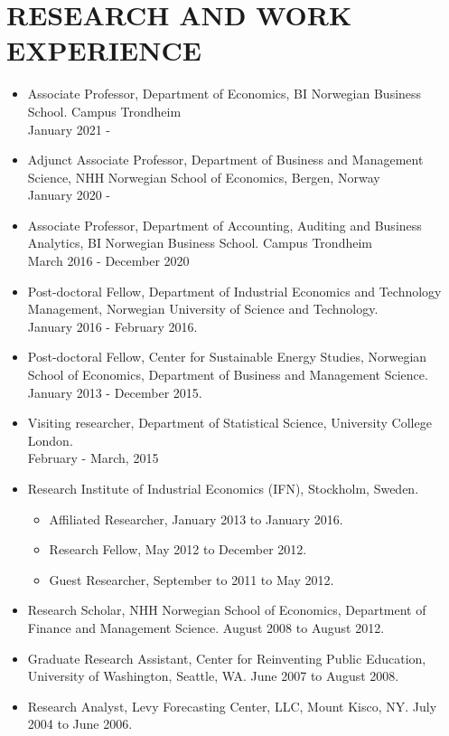 \documentclass[margin]{res}
\begin{document}
\section{RESEARCH AND WORK EXPERIENCE}
                  \begin{itemize}
                  \setlength{\itemsep}{10pt}
                  \item[] Associate Professor, Department of Economics, BI Norwegian Business School. Campus Trondheim \\ January 2021 -
                  \item[] Adjunct Associate Professor, Department of Business and Management Science, NHH Norwegian School of Economics, Bergen, Norway \\ January 2020 -
                  \item[] Associate Professor, Department of Accounting, Auditing and Business Analytics, BI Norwegian Business School. Campus Trondheim \\ March 2016 - December 2020
                  \item[] Post-doctoral Fellow, Department of Industrial Economics and Technology Management, Norwegian University of Science and Technology. \\ January 2016 - February 2016.
                  \item[] Post-doctoral Fellow, Center for Sustainable Energy Studies, Norwegian School of Economics, Department of Business and Management Science. \\ January 2013 - December 2015.

                  \item[] Visiting researcher, Department of Statistical Science, University College London. \\ February - March, 2015

                  \item[] Research Institute of Industrial Economics (IFN), Stockholm, Sweden.
                    \begin{itemize}
                    \item[] Affiliated Researcher, January 2013 to January 2016.
                    \item[] Research Fellow, May 2012 to December 2012.
                    \item[] Guest Researcher, September to 2011 to May 2012.
                    \end{itemize}
                  \item[] Research Scholar, NHH Norwegian School of Economics, Department of Finance and Management Science. August 2008 to August 2012.

                  \item[] Graduate Research Assistant, Center for Reinventing Public Education, University of Washington, Seattle, WA. June 2007 to August 2008.

                  \item[] Research Analyst, Levy Forecasting Center, LLC, Mount Kisco, NY. July 2004 to June 2006.

                  \end{itemize}
\end{document}
